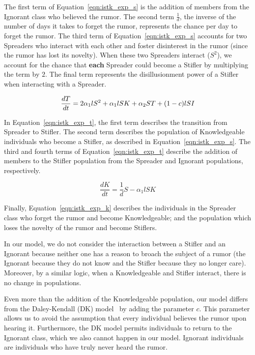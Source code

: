 \noindent The first term of Equation~\ref{eqn:istk_exp_s} is the addition of members from the Ignorant class who believed the rumor.
The second term $ \frac{1}{d} $, the inverse of the number of days it takes to forget the rumor, represents the chance per day to forget the rumor.
The third term of Equation~\ref{eqn:istk_exp_s} accounts for two Spreaders who interact with each other and foster disinterest in the rumor (since the rumor has lost its novelty).
When these two Spreaders interact ($ S^2 $), we account for the chance that \textbf{each} Spreader could become a Stifler by multiplying the term by $ 2 $.
The final term represents the disillusionment power of a Stifler when interacting with a Spreader.

\begin{equation}
\label{eqn:istk_exp_t} \frac{dT}{dt} = 2 \alpha_1l S^2 + \alpha_1l SK + \alpha_2 ST + (1-c)lSI \\
\end{equation}

\noindent In Equation~\ref{eqn:istk_exp_t}, the first term describes the transition from Spreader to Stifler.
The second term describes the population of Knowledgeable individuals who become a Stifler, as described in Equation~\ref{eqn:istk_exp_s}.
The third and fourth terms of Equation~\ref{eqn:istk_exp_t} describe the addition of members to the Stifler population from the Spreader and Ignorant populations, respectively.

\begin{equation}
\label{eqn:istk_exp_k} \frac{dK}{dt} = \frac{1}{d}S - \alpha_1l SK
\end{equation}

\noindent Finally, Equation~\ref{eqn:istk_exp_k} describes the individuals in the Spreader class who forget the rumor and become Knowledgeable; and the population which loses the novelty of the rumor and become Stiflers.

In our model, we do not consider the interaction between a Stifler and an Ignorant because neither one has a reason to broach the subject of a rumor (the Ignorant because they do not know and the Stifler because they no longer care).
Moreover, by a similar logic, when a Knowledgeable and Stifler interact, there is no change in populations.

Even more than the addition of the Knowledgeable population, our model differs from the Daley-Kendall (DK) model~\cite{daley-1965} by adding the parameter $ c $.
This parameter allows us to avoid the assumption that every individual believes the rumor upon hearing it.
Furthermore, the DK model permits individuals to return to the Ignorant class, which we also cannot happen in our model. Ignorant individuals are individuals who have truly never heard the rumor.
